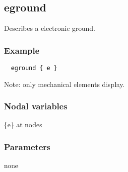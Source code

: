   
\subsection{eground}
 
Describes a electronic ground. 

\subsubsection*{Example}
\begin{verbatim}
  eground { e }
\end{verbatim}

Note: only mechanical elements display. 

\subsubsection*{Nodal variables}

\{e\} at nodes 
 
\subsubsection*{Parameters}

none 

